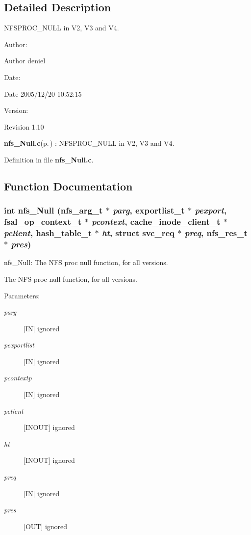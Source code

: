 \subsection{Detailed Description}
NFSPROC\_\-NULL in V2, V3 and V4. 

\begin{Desc}
\item[Author:]\begin{Desc}
\item[Author]deniel \end{Desc}
\end{Desc}
\begin{Desc}
\item[Date:]\begin{Desc}
\item[Date]2005/12/20 10:52:15 \end{Desc}
\end{Desc}
\begin{Desc}
\item[Version:]\begin{Desc}
\item[Revision]1.10 \end{Desc}
\end{Desc}
{\bf nfs\_\-Null.c}{\rm (p.\,\pageref{nfs__Null_8c})} : NFSPROC\_\-NULL in V2, V3 and V4.

Definition in file {\bf nfs\_\-Null.c}.

\subsection{Function Documentation}
\subsubsection{\setlength{\rightskip}{0pt plus 5cm}int nfs\_\-Null (nfs\_\-arg\_\-t $\ast$ {\em parg}, exportlist\_\-t $\ast$ {\em pexport}, fsal\_\-op\_\-context\_\-t $\ast$ {\em pcontext}, cache\_\-inode\_\-client\_\-t $\ast$ {\em pclient}, hash\_\-table\_\-t $\ast$ {\em ht}, struct svc\_\-req $\ast$ {\em preq}, nfs\_\-res\_\-t $\ast$ {\em pres})}\label{nfs__Null_8c_a0}


nfs\_\-Null: The NFS proc null function, for all versions.

The NFS proc null function, for all versions.

\begin{Desc}
\item[Parameters:]
\begin{description}
\item[{\em parg}][IN] ignored \item[{\em pexportlist}][IN] ignored \item[{\em pcontextp}][IN] ignored \item[{\em pclient}][INOUT] ignored \item[{\em ht}][INOUT] ignored \item[{\em preq}][IN] ignored \item[{\em pres}][OUT] ignored \end{description}
\end{Desc}


